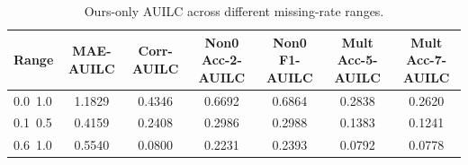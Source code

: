 \begin{table}[t]
\centering
\small
\begin{tabular}{lcccccc}
\toprule
Range & MAE-AUILC & Corr-AUILC & Non0 Acc-2-AUILC & Non0 F1-AUILC & Mult Acc-5-AUILC & Mult Acc-7-AUILC \\
\midrule
0.0~1.0 & 1.1829 & 0.4346 & 0.6692 & 0.6864 & 0.2838 & 0.2620 \\
0.1~0.5 & 0.4159 & 0.2408 & 0.2986 & 0.2988 & 0.1383 & 0.1241 \\
0.6~1.0 & 0.5540 & 0.0800 & 0.2231 & 0.2393 & 0.0792 & 0.0778 \\
\bottomrule
\end{tabular}
\caption{Ours-only AUILC across different missing-rate ranges.}
\label{tab:ours_auilc_00_10}
\end{table}